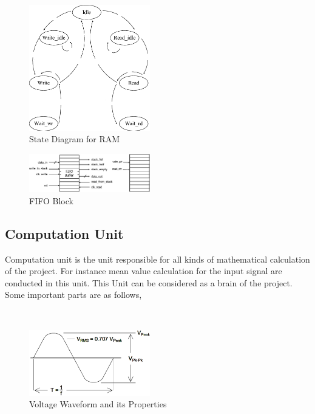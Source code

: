 \documentclass[paper]{IEEEtran}
\begin{document}
\begin{figure}[h!]
			\setlength{\unitlength}{\textwidth}
			\center 
			\includegraphics[width=0.47\textwidth]{RAM_state}
			\caption{\label{fig:RAM State} State Diagram for RAM}
\end{figure}

\begin{figure}[h!]
	\setlength{\unitlength}{\textwidth}
	\center 
	\includegraphics[width=0.47\textwidth]{fifo_ports}
	\caption{\label{fig:fifo_ports} FIFO Block}
\end{figure}
		
		
\subsection{Computation Unit} \- \indent
	Computation unit is the unit responsible for all kinds of mathematical calculation of the project. For instance mean value calculation for the input signal are conducted in this unit. This Unit can be considered as a brain of the project. Some important parts are as follows,	

\- \\

\begin{figure}[h!]
	\setlength{\unitlength}{\textwidth}
	\center 
	\includegraphics[width=0.47\textwidth]{voltage}
	\caption{\label{fig:waveform} Voltage Waveform and its Properties}
\end{figure}
\end{document}
